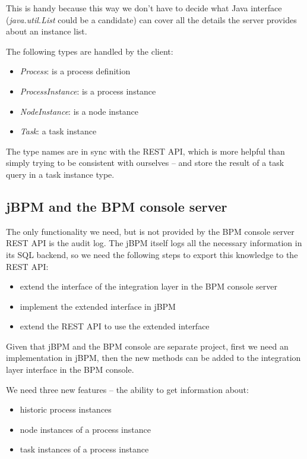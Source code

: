 This is handy because this way we don't have to decide what Java interface
(\emph{java.util.List} could be a candidate) can cover all the details the
server provides about an instance list.

The following types are handled by the client:

\begin{itemize}
\item \emph{Process}: is a process definition
\item \emph{ProcessInstance}: is a process instance
\item \emph{NodeInstance}: is a node instance
\item \emph{Task}: a task instance
\end{itemize}

The type names are in sync with the REST API, which is more helpful than simply
trying to be consistent with ourselves -- and store the result of a task query
in a task instance type.

\subsection{jBPM and the BPM console server}

The only functionality we need, but is not provided by the BPM console server
REST API is the audit log. The jBPM itself logs all the necessary information in
its SQL backend, so we need the following steps to export this knowledge to the
REST API:

\begin{itemize}
\item extend the interface of the integration layer in the BPM console server
\item implement the extended interface in jBPM
\item extend the REST API to use the extended interface
\end{itemize}

Given that jBPM and the BPM console are separate project, first we need an
implementation in jBPM, then the new methods can be added to the integration
layer interface in the BPM console.


We need three new features -- the ability to get information about:

\begin{itemize}
\item historic process instances
\item node instances of a process instance
\item task instances of a process instance
\end{itemize}

